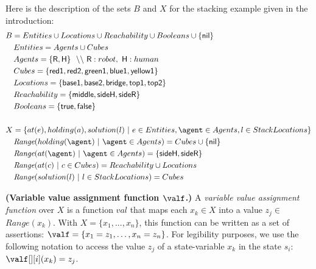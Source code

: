 Here is the description of the sets $B$ and $X$ for the stacking example given in the introduction:
{\small
\begin{align*}
&B           = Entities \cup Locations \cup Reachability \cup Booleans \cup \{\textsf{nil}\} \\
&\quad Entities    = Agents \cup Cubes\\
&\quad Agents      = \{ \textsf{R}, \textsf{H} \} ~~ \backslash\backslash~\textsf{R}:robot,~\textsf{H}:human\\
&\quad Cubes     = \{ \textsf{red1}, \textsf{red2}, \textsf{green1}, \textsf{blue1}, \textsf{yellow1} \}\\
&\quad Locations     = \{ \textsf{base1}, \textsf{base2}, \textsf{bridge}, \textsf{top1}, \textsf{top2} \}\\
&\quad Reachability     = \{ \textsf{middle}, \textsf{sideH}, \textsf{sideR} \}\\
&\quad Booleans    = \{ \textsf{true},\textsf{false} \}\\
&\\
&X = \{ at(e), holding(a), solution(l) ~ | ~ e \in Entities, \agent \in Agents, l \in StackLocations\}\\
&\quad \textit{Range}(holding(\agent) ~|~ \agent \in Agents) = Cubes \cup \{\textsf{nil}\} \\
&\quad \textit{Range}(at(\agent) ~|~ \agent \in Agents) = \{ \textsf{sideH}, \textsf{sideR} \}\\
&\quad \textit{Range}(at(c) ~|~ c \in Cubes) = Reachability \cup Locations\\
&\quad \textit{Range}(solution(l) ~|~ l \in StackLocations) = Cubes \\
\end{align*}
}



\begin{definition}
    \textbf{(Variable value assignment function $\valf$.)} A \emph{variable value assignment function} over $X$ is a function $val$ that maps each $x_k \in X$ into a value $z_j \in$ $\textit{Range}(x_k)$.
    With $X = \{ x_1, ..., x_n \}$, this function can be written as a set of assertions: $\valf = \{ x_1=z_1, \ldots, x_n=z_n \}$. 
    For legibility purposes, we use the following notation to access the value $z_j$ of a state-variable $x_k$ in the state $s_i$: $\valf[][i](x_k) = z_j$.
    \label{def:variable_value_assignment_function}
\end{definition}


